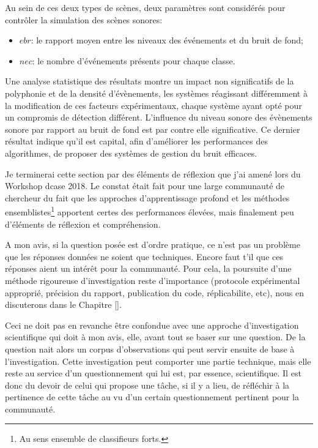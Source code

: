 Au sein de ces deux types de scènes, deux paramètres sont considérés pour contrôler la simulation des scènes sonores:
\begin{itemize}
\item $ebr$: le rapport moyen entre les niveaux des événements et du bruit de fond;
\item $nec$: le nombre d'événements présents pour chaque classe.
\end{itemize}

Une analyse statistique des résultats\cite{lafayhal-01635414} montre un impact non significatifs de la polyphonie et de la densité d'évènements, les systèmes réagissant différemment à la modification de ces facteurs expérimentaux, chaque système ayant opté pour un compromis de détection différent. L'influence du niveau sonore des évènements sonore par rapport au bruit de fond est par contre elle significative. Ce dernier résultat indique qu'il est capital, afin d'améliorer les performances des algorithmes, de proposer des systèmes de gestion du bruit efficaces.

Je terminerai cette section par des éléments de réflexion que j'ai amené lors du Workshop dcase 2018. Le constat était fait pour une large communauté de chercheur du fait que les approches d'apprentissage profond et les méthodes ensemblistes\footnote{Au sens ensemble de classifieurs forts.} apportent certes des performances élevées, mais finalement peu d'éléments de réflexion et compréhension.

A mon avis, si la question posée est d'ordre pratique, ce n'est pas un problème que les réponses données ne soient que techniques. Encore faut t'il que ces réponses aient un intérêt pour la communauté. Pour cela, la poursuite d'une méthode rigoureuse d'investigation reste d'importance (protocole expérimental approprié, précision du rapport, publication du code, réplicabilite, etc), nous en discuterons dans le Chapitre \ref{}.

Ceci ne doit pas en revanche être confondue avec une approche d'investigation scientifique qui doit à mon avis, elle, avant tout se baser sur une question. De la question nait alors un corpus d'observations qui peut servir ensuite de base à l'investigation. Cette investigation peut comporter une partie technique, mais elle reste au service d'un questionnement qui lui est, par essence, scientifique. Il est donc du devoir de celui qui propose une tâche, si il y a lieu, de réfléchir à la pertinence de cette tâche au vu d'un certain questionnement pertinent pour la communauté.


